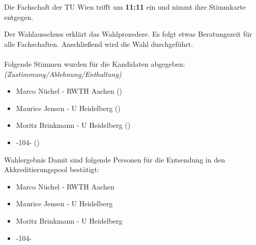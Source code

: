     \begin{info}{}
      Die Fachschaft der TU Wien trifft um \textbf{11:11} ein und nimmt ihre Stimmkarte entgegen.
    \end{info}

    Der Wahlausschuss erklärt das Wahlprozedere.
    Es folgt etwas Beratungszeit für alle Fachschaften. Anschließend wird die Wahl durchgeführt. \\ \\

    Folgende Stimmen wurden für die Kandidaten abgegeben: \textit{(Zustimmung/Ablehnung/Enthaltung)}
    \begin{itemize}
      \item Marco Nüchel - RWTH Aachen ()
      \item Maurice Jensen - U Heidelberg ()
      \item Moritz Brinkmann - U Heidelberg ()
      \item -104- ()
    \end{itemize}

    \begin{success}{Wahlergebnis}
      Damit sind folgende Personen für die Entsendung in den Akkreditierungspool bestätigt:
      \begin{itemize}
        \item Marco Nüchel - RWTH Aachen
        \item Maurice Jensen - U Heidelberg
        \item Moritz Brinkmann - U Heidelberg
        \item -104-
      \end{itemize}
    \end{success}



